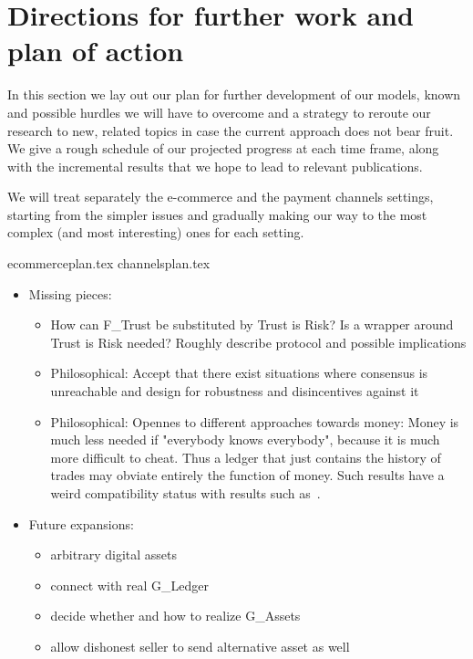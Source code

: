 \section{Directions for further work and plan of action}
\label{sec:plan}
  In this section we lay out our plan for further development of our models, known and
  possible hurdles we will have to overcome and a strategy to reroute our research to new,
  related topics in case the current approach does not bear fruit. We give a rough
  schedule of our projected progress at each time frame, along with the incremental
  results that we hope to lead to relevant publications.

  We will treat separately the e-commerce and the payment channels settings, starting from
  the simpler issues and gradually making our way to the most complex (and most
  interesting) ones for each setting.

  {ecommerceplan.tex}
  {channelsplan.tex}
  \begin{itemize}
    \item Missing pieces:
    \begin{itemize}
      \item How can F\_Trust be substituted by Trust is Risk? Is a wrapper around Trust is
      Risk needed? Roughly describe protocol and possible implications
      \item Philosophical: Accept that there exist situations where consensus is
      unreachable and design for robustness and disincentives against it
      \item Philosophical: Opennes to different approaches towards money: Money is much
      less needed if "everybody knows everybody", because it is much more difficult to
      cheat. Thus a ledger that just contains the history of trades may obviate entirely
      the function of money. Such results have a weird compatibility status with results
      such as~\cite{marketequilibrium}.
    \end{itemize}
    \item Future expansions:
    \begin{itemize}
      \item arbitrary digital assets
      \item connect with real G\_Ledger
      \item decide whether and how to realize G\_Assets
      \item allow dishonest seller to send alternative asset as well
    \end{itemize}
  \end{itemize}
